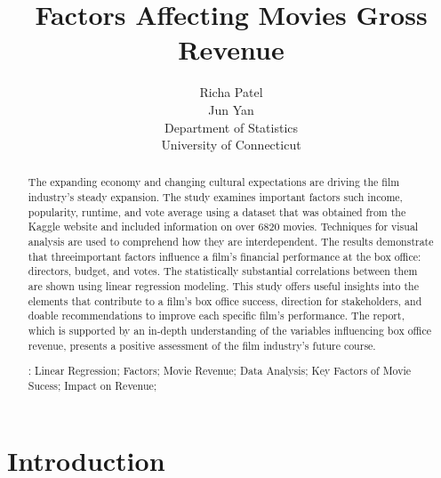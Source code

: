 \documentclass[12pt]{article}
\title{Factors Affecting Movies Gross Revenue}
\author{Richa Patel\\
  Jun Yan\\[2ex]
  Department of Statistics\\
  University of Connecticut\\
}
\begin{document}
\maketitle
\doublespace

\begin{abstract}

The expanding economy and changing cultural expectations are driving the film industry's 
steady expansion. The study examines important factors such income, popularity,
runtime, and vote average using a dataset that was obtained from the Kaggle website and 
included information on over 6820 movies. Techniques for visual analysis are used to 
comprehend how they are interdependent. The results demonstrate that threeimportant 
factors influence a film's financial performance at the box office: directors, budget,
and votes. The statistically substantial correlations between them are shown using 
linear regression modeling. This study offers useful insights into the elements that 
contribute to a film's box office success, direction for stakeholders, and doable
recommendations to improve each specific film's performance. The report, which is supported 
by an in-depth understanding of the variables influencing box office revenue, presents
a positive assessment of the film industry's future course.


\bigskip
{}:
Linear Regression; 
Factors;
Movie Revenue;
Data Analysis;
Key Factors of Movie Sucess;
Impact on Revenue;

\end{abstract}


\section{Introduction}
\label{sec:intro}
\end{document}
